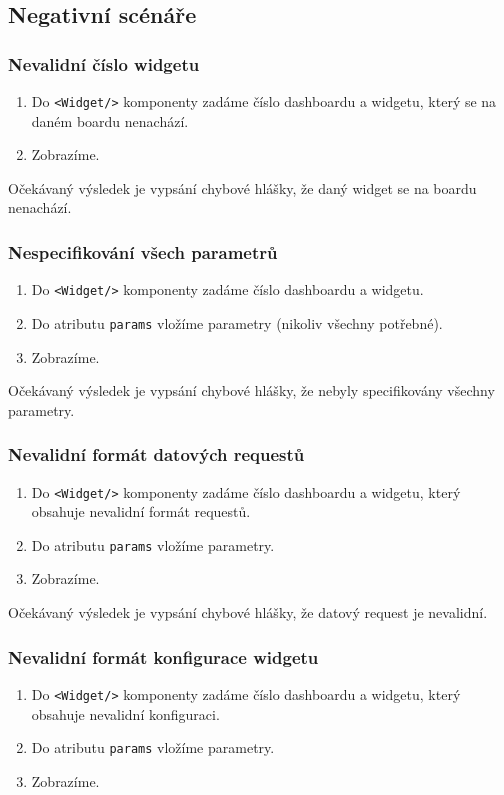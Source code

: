 \documentclass[czech, bc, kiv, he, iso690numb]{fasthesis}
\begin{document}
\subsection{Negativní scénáře}
\subsubsection{Nevalidní číslo widgetu}
\begin{enumerate}
	\item Do \texttt{<Widget/>} komponenty zadáme číslo dashboardu a widgetu, který se na daném boardu nenachází.
	\item Zobrazíme.
\end{enumerate}
Očekávaný výsledek je vypsání chybové hlášky, že daný widget se na boardu nenachází.

\subsubsection{Nespecifikování všech parametrů}
\begin{enumerate}
	\item Do \texttt{<Widget/>} komponenty zadáme číslo dashboardu a widgetu.
	\item Do atributu \texttt{params} vložíme parametry (nikoliv všechny potřebné).
	\item Zobrazíme.
\end{enumerate}
Očekávaný výsledek je vypsání chybové hlášky, že nebyly specifikovány všechny parametry.

\subsubsection{Nevalidní formát datových requestů}
\begin{enumerate}
	\item Do \texttt{<Widget/>} komponenty zadáme číslo dashboardu a widgetu, který obsahuje nevalidní formát requestů.
	\item Do atributu \texttt{params} vložíme parametry.
	\item Zobrazíme.
\end{enumerate}
Očekávaný výsledek je vypsání chybové hlášky, že datový request je nevalidní.

\subsubsection{Nevalidní formát konfigurace widgetu}
\begin{enumerate}
	\item Do \texttt{<Widget/>} komponenty zadáme číslo dashboardu a widgetu, který obsahuje nevalidní konfiguraci.
	\item Do atributu \texttt{params} vložíme parametry.
	\item Zobrazíme.
\end{enumerate}
\end{document}
